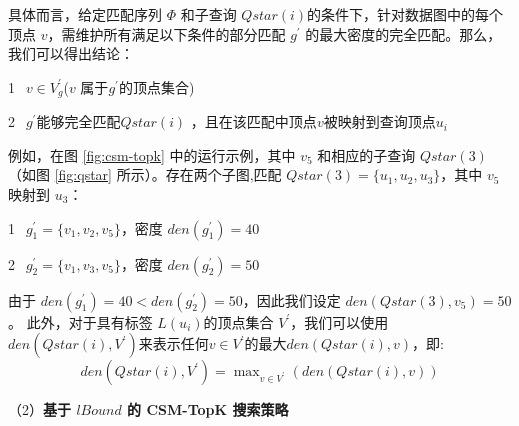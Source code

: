 具体而言，给定匹配序列 $\Phi$ 和子查询 $Qstar(i)$的条件下，针对数据图中的每个顶点 $v$，需维护所有满足以下条件的部分匹配 $g^\prime$ 的最大密度的完全匹配。那么，我们可以得出结论：

\textcircled{1}~$v \in V_g^{\prime}$($v$ 属于$g^{\prime}$的顶点集合)

\textcircled{2}~$g^{\prime}$能够完全匹配$Qstar(i)$ ，且在该匹配中顶点$v$被映射到查询顶点$u_i$

例如，在图 \ref{fig:csm-topk} 中的运行示例，其中 $v_5$ 和相应的子查询 $Qstar(3)$（如图 \ref{fig:qstar} 所示）。存在两个子图,匹配 $Qstar(3)=\{u_1, u_2, u_3\}$，其中 $v_5$ 映射到 $u_3$：

     \textcircled{1}~$g_1^\prime=\{v_1, v_2, v_5\}$，密度 $den(g_1^\prime) = 40$

     \textcircled{2}~$g_2^\prime=\{v_1, v_3, v_5\}$，密度 $den(g_2^\prime) = 50$

由于 $den(g_1^\prime)= 40 < den(g_2^\prime)=50$，因此我们设定 $den(Qstar(3), v_5) = 50$。
此外，对于具有标签 $L(u_i)$的顶点集合 $V^\prime$，我们可以使用$den(Qstar(i), V^\prime)$来表示任何$v\in V^\prime$的最大$den(Qstar(i), v)$，即:
\begin{equation}\label{equation:den-qstar-v}
	den(Qstar(i), V^\prime) = \max\nolimits_{v\in V^\prime}\left(den(Qstar(i), v)\right)
\end{equation}


（2）\textbf{基于 $lBound$ 的 CSM-TopK 搜索策略}

